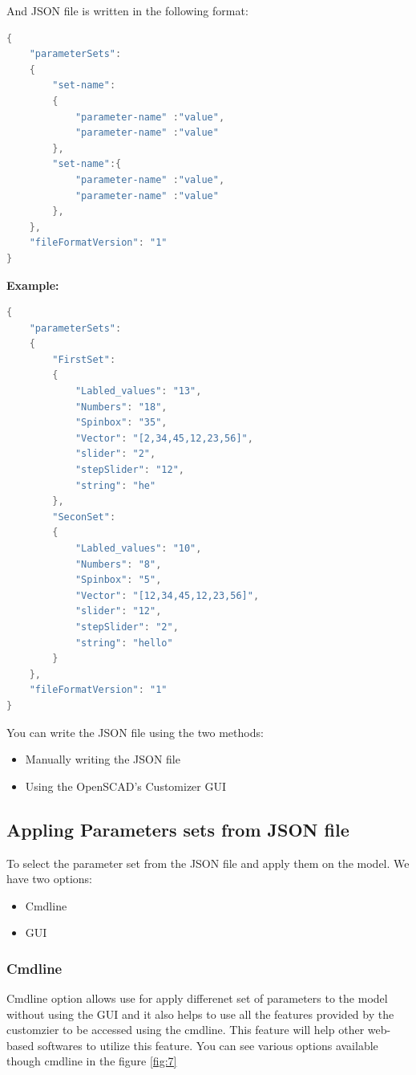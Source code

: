 And JSON file is written in the following format:

\begin{lstlisting}[language=Java]
{
    "parameterSets":
    {
        "set-name":
        {
            "parameter-name" :"value",
            "parameter-name" :"value"
        },
        "set-name":{
            "parameter-name" :"value",
            "parameter-name" :"value"
        },
    },
    "fileFormatVersion": "1"
}
\end{lstlisting}

\textbf{Example:}
\begin{lstlisting}[language=Java]
{
    "parameterSets":
    {
        "FirstSet":
        {
            "Labled_values": "13",
            "Numbers": "18",
            "Spinbox": "35",
            "Vector": "[2,34,45,12,23,56]",
            "slider": "2",
            "stepSlider": "12",
            "string": "he"
        },
        "SeconSet":
        {
            "Labled_values": "10",
            "Numbers": "8",
            "Spinbox": "5",
            "Vector": "[12,34,45,12,23,56]",
            "slider": "12",
            "stepSlider": "2",
            "string": "hello"
        }
    },
    "fileFormatVersion": "1"
}
\end{lstlisting}

You can write the JSON file using the two methods:
\begin{itemize}
    \item Manually writing the JSON file
    \item Using the OpenSCAD's Customizer GUI
\end{itemize}

\subsection{Appling Parameters sets from JSON file}
To select the parameter set from the JSON file and apply them on the model. We have two options:

\begin{itemize}
    \item Cmdline
    \item GUI
\end{itemize}

\subsubsection{Cmdline}
Cmdline option allows use for apply differenet set of parameters to the model without using the GUI and it also helps to use all the features provided by the customzier to be accessed using the cmdline. This feature will help other web-based softwares to utilize this feature. You can see various options available though cmdline in the figure \ref{fig:7}
 
